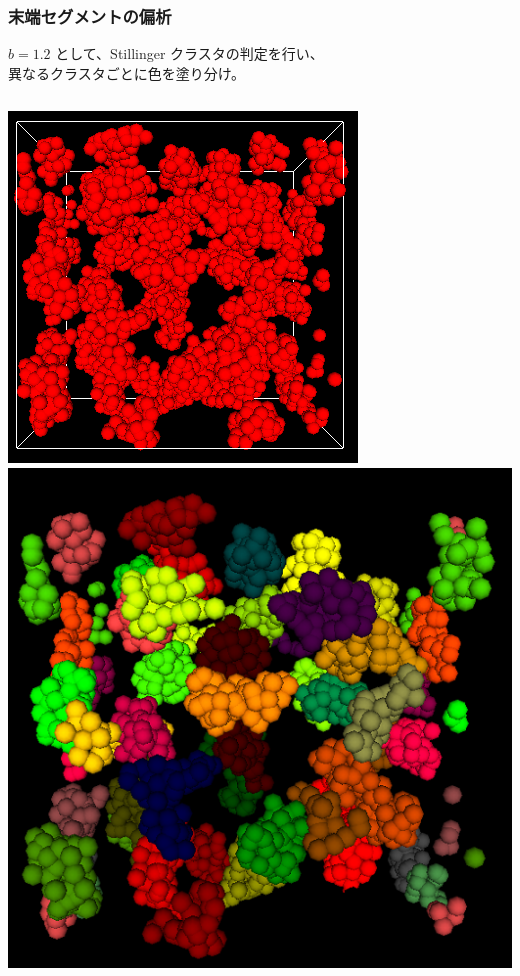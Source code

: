 \documentclass[12pt, dvipdfmx]{beamer}
\begin{document}
\begin{frame}
\frametitle{末端セグメントの偏析}

$b=1.2$ として、Stillinger クラスタの判定を行い、\\異なるクラスタごとに色を塗り分け。

\begin{columns}[T, totalwidth=0.96\linewidth]
	\includegraphics[width=\columnwidth]{./fig/snap_2.png}
	\includegraphics[width=\columnwidth]{./fig/snap_color.png}
\end{columns}

\end{frame}
\end{document}

